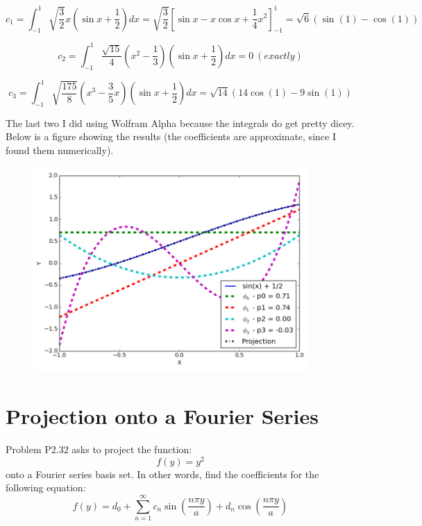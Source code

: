 \documentclass[12pt, openany, letterpaper]{memoir}
\begin{document}
\begin{equation*}
	c_1 = \int_{-1}^{1}\sqrt{\frac{3}{2}}x\left(\sin{x}+\frac{1}{2}\right)dx = \sqrt{\frac{3}{2}}\left[\sin{x} -x\cos{x} +\frac{1}{4}x^2\right]_{-1}^{1} =  \sqrt{6}\left(\sin(1)-\cos(1)\right)
\end{equation*}

\begin{equation*}
	c_2 = \int_{-1}^{1}\frac{\sqrt{15}}{4}\left(x^2-\frac{1}{3}\right)\left(\sin{x}+\frac{1}{2}\right)dx = 0 ~(exactly)
\end{equation*}

\begin{equation*}
	c_3 = \int_{-1}^{1}\sqrt{\frac{175}{8}}\left(x^3-\frac{3}{5}x\right)\left(\sin{x}+\frac{1}{2}\right)dx = \sqrt{14}\left(14\cos(1)-9\sin(1)\right)
\end{equation*}

The last two I did using Wolfram Alpha because the integrals do get pretty dicey. Below is a figure showing the results (the coefficients are approximate, since I found them numerically).

\begin{figure}[h!]
  \centering
  \includegraphics[width=0.93\textwidth]{figures/Projection}
\end{figure}

\section*{Projection onto a Fourier Series}

Problem P2.32 asks to project the function:
\begin{equation*}
	f(y) = y^2
\end{equation*}
onto a Fourier series basis set. In other words, find the coefficients for the following equation:
\begin{equation*}
	f(y) = d_0 + \sum_{n=1}^\infty c_n\sin\left(\frac{n\pi y}{a}\right) + d_n\cos\left(\frac{n\pi y}{a}\right)
\end{equation*}
\end{document}
